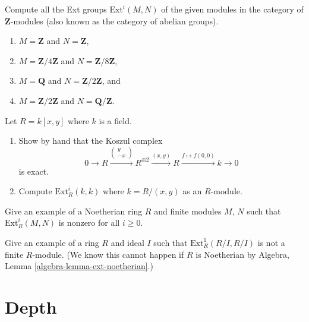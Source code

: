 \begin{exercise}
\label{exercise-compute-ext-abelian-groups}
Compute all the Ext groups $\text{Ext}^i(M, N)$ of the given modules
in the category of $\mathbf{Z}$-modules
(also known as the category of abelian groups).
\begin{enumerate}
\item $M = \mathbf{Z}$ and $N = \mathbf{Z}$,
\item $M = \mathbf{Z}/4\mathbf{Z}$ and $N = \mathbf{Z}/8\mathbf{Z}$,
\item $M = \mathbf{Q}$ and $N = \mathbf{Z}/2\mathbf{Z}$, and
\item $M = \mathbf{Z}/2\mathbf{Z}$ and $N = \mathbf{Q}/\mathbf{Z}$.
\end{enumerate}
\end{exercise}

\begin{exercise}
\label{exercise-compute-in-regular}
Let $R = k[x, y]$ where $k$ is a field.
\begin{enumerate}
\item Show by hand that the Koszul complex
$$
0 \to R
\xrightarrow{
\left(
\begin{matrix}
y \\
-x
\end{matrix}
\right)
}
R^{\oplus 2} \xrightarrow{(x, y)} R \xrightarrow{f \mapsto f(0, 0)} k \to 0
$$
is exact.
\item Compute $\text{Ext}^i_R(k, k)$ where $k = R/(x, y)$ as an $R$-module.
\end{enumerate}
\end{exercise}

\begin{exercise}
\label{exercise-infinitely-many-nonzero-ext}
Give an example of a Noetherian ring $R$ and finite modules $M$, $N$
such that $\text{Ext}^i_R(M, N)$ is nonzero for all $i \geq 0$.
\end{exercise}

\begin{exercise}
\label{exercise-infinite-ext}
Give an example of a ring $R$ and ideal $I$ such that
$\text{Ext}^1_R(R/I, R/I)$ is not a finite $R$-module.
(We know this cannot happen if $R$ is Noetherian by
Algebra, Lemma \ref{algebra-lemma-ext-noetherian}.)
\end{exercise}







\section{Depth}
\label{section-depth}

